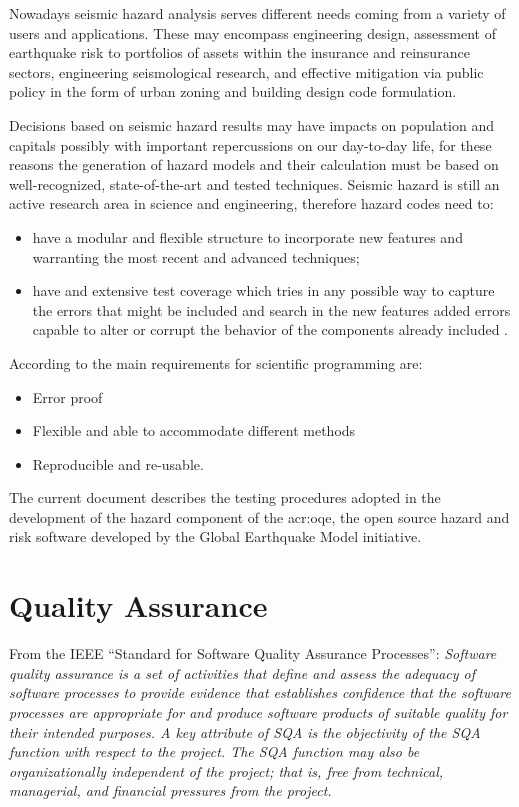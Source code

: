 Nowadays seismic hazard analysis serves different needs coming 
from a variety of users and applications. 
%
These may encompass engineering design, assessment of earthquake risk 
to portfolios of assets within the insurance and reinsurance sectors, 
engineering seismological research, and effective mitigation via public 
policy in the form of urban zoning and building design code formulation.

Decisions based on seismic hazard results may have impacts on
population and capitals possibly with important repercussions 
on our day-to-day life, for these reasons the generation of hazard 
models and their calculation must be based on well-recognized, 
state-of-the-art and tested techniques. 
% 
Seismic hazard is still an active research area in science 
and engineering, therefore hazard codes need to:
\begin{itemize}
\item have a modular and flexible structure to incorporate new 
features and warranting the most recent and advanced techniques;
\item have and extensive test coverage which tries in any possible 
way to capture the errors that might be included and search 
in the new features added errors capable to alter or corrupt the 
behavior of the components already included \parencite{myers2012}.
\end{itemize}

According to \textcite{berkes2012} the main requirements for 
scientific programming are:
\begin{itemize}
\item Error proof
\item Flexible and able to accommodate different methods
\item Reproducible and re-usable. 
\end{itemize}



The current document describes the testing procedures adopted in 
the development of the hazard component of the \gls{acr:oqe}, the 
open source hazard and risk software developed by the Global 
Earthquake Model initiative.

 
%
\section{Quality Assurance}
From the IEEE ``Standard for Software Quality Assurance Processes'':
\emph{Software quality assurance is a set of activities that define and 
assess the adequacy of software processes to provide evidence that establishes 
confidence that the software processes are appropriate for and produce 
software products of suitable quality for their intended purposes. 
A key attribute of SQA is the objectivity of the SQA function with 
respect to the project. The SQA function may also be organizationally 
independent of the project; that is, free from technical, managerial, 
and financial pressures from the project.}
%
